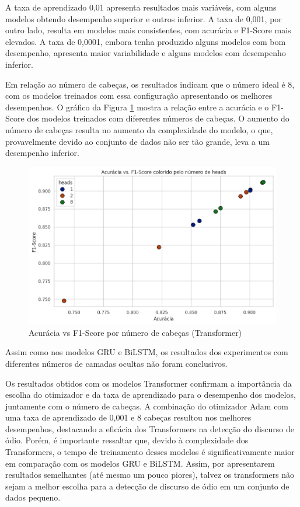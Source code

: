 \documentclass[conference]{IEEEtran}
\begin{document}
A taxa de aprendizado 0,01 apresenta resultados mais variáveis, com alguns modelos obtendo desempenho superior e outros inferior. A taxa de 0,001, por outro lado, resulta em modelos mais consistentes, com acurácia e F1-Score mais elevados. A taxa de 0,0001, embora tenha produzido alguns modelos com bom desempenho, apresenta maior variabilidade e alguns modelos com desempenho inferior.

Em relação ao número de cabeças, os resultados indicam que o número ideal é 8, com os modelos treinados com essa configuração apresentando os melhores desempenhos. O gráfico da Figura \ref{fig:transformer_acu_heads} mostra a relação entre a acurácia e o F1-Score dos modelos treinados com diferentes números de cabeças. O aumento do número de cabeças resulta no aumento da complexidade do modelo, o que, provavelmente devido ao conjunto de dados não ser tão grande, leva a um desempenho inferior.

\begin{figure}[h!]
    \centering
    \includegraphics[width=\linewidth]{images/transformer_acu_heads.png}
    \caption{Acurácia vs F1-Score por número de cabeças (Transformer)}
    \label{fig:transformer_acu_heads}
\end{figure}

Assim como nos modelos GRU e BiLSTM, os resultados dos experimentos com diferentes números de camadas ocultas não foram conclusivos.

Os resultados obtidos com os modelos Transformer confirmam a importância da escolha do otimizador e da taxa de aprendizado para o desempenho dos modelos, juntamente com o número de cabeças. A combinação do otimizador Adam com uma taxa de aprendizado de 0,001 e 8 cabeças resultou nos melhores desempenhos, destacando a eficácia dos Transformers na detecção do discurso de ódio. Porém, é importante ressaltar que, devido à complexidade dos Transformers, o tempo de treinamento desses modelos é significativamente maior em comparação com os modelos GRU e BiLSTM. Assim, por apresentarem resultados semelhantes (até mesmo um pouco piores), talvez os transformers não sejam a melhor escolha para a detecção de discurso de ódio em um conjunto de dados pequeno.
\end{document}
